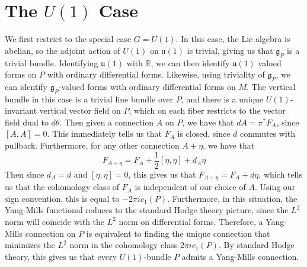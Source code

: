 \documentclass[psamsfonts, 12pt]{amsart}
\theoremstyle{definition}
\theoremstyle{remark}
\newcommand{\R}{\mathbb{R}}
\newcommand{\g}{\mathfrak{g}}
\begin{document}
\section{The $U(1)$ Case}
%
We first restrict to the special case $G = U(1)$. In this case, the
Lie algebra is abelian, so the adjoint action of $U(1)$ on $\mathfrak{u}(1)$ is trivial,
giving us that $\g_P$ is a trivial bundle. Identifying $\mathfrak{u}(1)$ with
$\R$, we can then identify $\mathfrak{u}(1)$ valued forms on $P$ with ordinary
differential forms. Likewise, using triviality of $\g_P$, we can identify
$\g_P$-valued forms with ordinary differential forms on $M$. The vertical bundle
in this case is a trivial line bundle over $P$, and there is a unique $U(1)$-invariant
vertical vector field on $P$, which on each fiber restricts to the vector field dual
to $d\theta$. Then given a connection $A$ on $P$, we have that $dA = \pi^*F_A$,
since $[A,A] = 0$. This immediately tells us that $F_A$ is closed, since $d$
commutes with pullback. Furthermore, for any other connection $A + \eta$, we have that
\[
F_{A+\eta} = F_A + \frac{1}{2}[\eta,\eta] + d_A\eta
\]
Then since $d_A = d$ and $[\eta,\eta] = 0$, this gives us that
$F_{A+\eta} = F_A + d\eta$, which tells us that the cohomology class of $F_A$ is
independent of our choice of $A$. Using our sign convention, this is equal to
$-2\pi i c_1(P)$. Furthermore, in this situation, the Yang-Mills functional reduces
to the standard Hodge theory picture, since the $L^2$ norm will coincide with the
$L^2$ norm on differential forms. Therefore, a Yang-Mills connection on $P$ is equivalent
to finding the unique connection that minimizes the $L^2$ norm in the cohomology class
$2\pi i c_1(P)$. By standard Hodge theory, this gives us that every $U(1)$-bundle $P$
admits a Yang-Mills connection.
%
\end{document}
